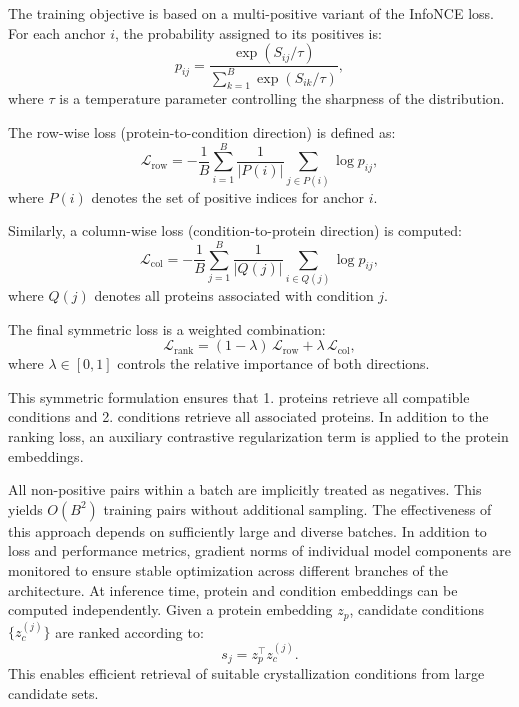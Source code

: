 The training objective is based on a multi-positive variant of the InfoNCE loss. For each anchor $i$, the probability assigned to its positives is:
\begin{equation}
    p_{ij} = \frac{\exp(S_{ij} / \tau)}
    {\sum_{k=1}^{B} \exp(S_{ik} / \tau)},
\end{equation}
where $\tau$ is a temperature parameter controlling the sharpness of the distribution.

The row-wise loss (protein-to-condition direction) is defined as:
\begin{equation}
    \mathcal{L}_{\text{row}} =
    - \frac{1}{B} \sum_{i=1}^{B}
    \frac{1}{|P(i)|}
    \sum_{j \in P(i)} \log p_{ij},
\end{equation}
where $P(i)$ denotes the set of positive indices for anchor $i$.

Similarly, a column-wise loss (condition-to-protein direction) is computed:
\begin{equation}
    \mathcal{L}_{\text{col}} =
    - \frac{1}{B} \sum_{j=1}^{B}
    \frac{1}{|Q(j)|}
    \sum_{i \in Q(j)} \log p_{ij},
\end{equation}
where $Q(j)$ denotes all proteins associated with condition $j$.

The final symmetric loss is a weighted combination:
\begin{equation}
    \mathcal{L}_{\text{rank}} =
    (1 - \lambda)\, \mathcal{L}_{\text{row}} +
    \lambda\, \mathcal{L}_{\text{col}},
\end{equation}
where $\lambda \in [0,1]$ controls the relative importance of both directions.

This symmetric formulation ensures that 1. proteins retrieve all compatible conditions and 2. conditions retrieve all associated proteins.
In addition to the ranking loss, an auxiliary contrastive regularization term is applied to the protein embeddings. 

All non-positive pairs within a batch are implicitly treated as negatives. This yields $O(B^2)$ training pairs without additional sampling. The effectiveness of this approach depends on sufficiently large and diverse batches.
In addition to loss and performance metrics, gradient norms of individual model components are monitored to ensure stable optimization across different branches of the architecture.
At inference time, protein and condition embeddings can be computed independently. Given a protein embedding $z_p$, candidate conditions $\{z_c^{(j)}\}$ are ranked according to:
\begin{equation}
    s_j = z_p^\top z_c^{(j)}.
\end{equation}
This enables efficient retrieval of suitable crystallization conditions from large candidate sets.
